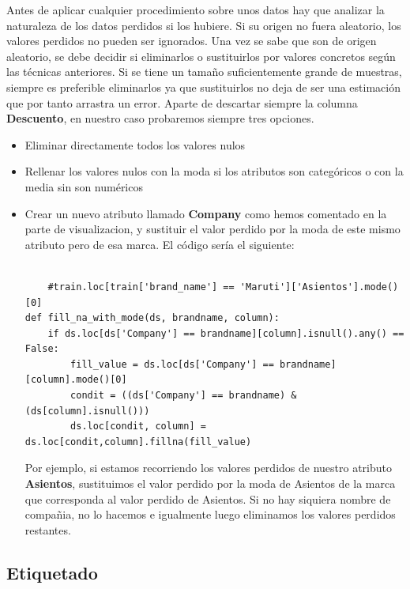 \documentclass[12pt,twoside]{report}
\begin{document}
Antes de aplicar cualquier procedimiento sobre unos datos hay que analizar
la naturaleza de los datos perdidos si los hubiere. Si su origen no fuera
aleatorio, los valores perdidos no pueden ser ignorados. Una vez se sabe que son de origen aleatorio, se debe decidir si eliminarlos o sustituirlos por valores concretos según las técnicas anteriores. Si se tiene un tamaño suficientemente grande de muestras, siempre es preferible
eliminarlos ya que sustituirlos no deja de ser una estimación que por tanto arrastra un error.
Aparte de descartar siempre la columna \textbf{Descuento}, en nuestro caso probaremos siempre tres opciones. 

\begin{itemize}
	\item Eliminar directamente todos los valores nulos
	\item Rellenar los valores nulos con la moda si los atributos son categóricos o con la media sin son numéricos
	\item Crear un nuevo atributo llamado \textbf{Company} como hemos comentado en la parte de visualizacion, y sustituir el valor perdido por la moda de este mismo atributo pero de esa marca. El código sería el siguiente:\\
	\\
	\begin{lstlisting}
	#train.loc[train['brand_name'] == 'Maruti']['Asientos'].mode()[0]
def fill_na_with_mode(ds, brandname, column):
    if ds.loc[ds['Company'] == brandname][column].isnull().any() == False:
        fill_value = ds.loc[ds['Company'] == brandname][column].mode()[0]
        condit = ((ds['Company'] == brandname) & (ds[column].isnull()))
        ds.loc[condit, column] = ds.loc[condit,column].fillna(fill_value)
	\end{lstlisting}
	
	Por ejemplo, si estamos recorriendo los valores perdidos de nuestro atributo \textbf{Asientos}, sustituimos el valor perdido por la moda de Asientos de la marca que corresponda al valor perdido de Asientos. Si no hay siquiera nombre de compañia, no lo hacemos e igualmente luego eliminamos los valores perdidos restantes.
\end{itemize}

\subsection*{Etiquetado}
\end{document}
